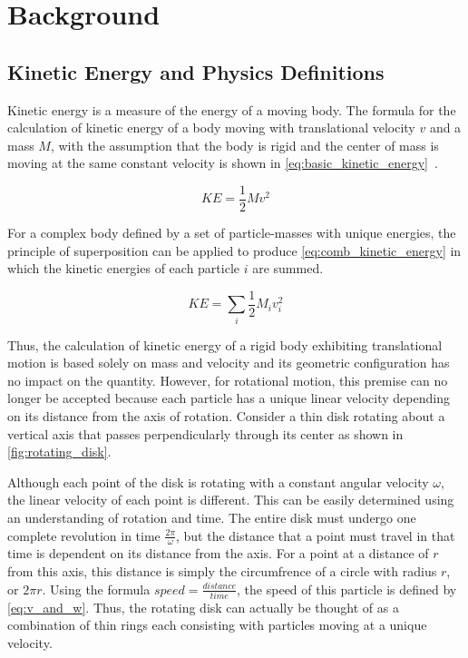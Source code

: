 \section{Background}
\label{sec:background}

\subsection{Kinetic Energy and Physics Definitions}
Kinetic energy is a measure of the energy of a moving body. The formula for the calculation of kinetic energy of a body moving with translational velocity $v$ and a mass $M$, with the assumption that the body is rigid and the center of mass is moving at the same constant velocity is shown in \cref{eq:basic_kinetic_energy}~\parencite{Young_Freedman_Young_2020}.

\begin{equation}
KE = \frac{1}{2}Mv^2
\label{eq:basic_kinetic_energy}
\end{equation}

For a complex body defined by a set of particle-masses with unique energies, the principle of superposition can be applied to produce \cref{eq:comb_kinetic_energy} in which the kinetic energies of each particle $i$ are summed.

\begin{equation}
KE = \sum_i\frac{1}{2}M_iv_i^2
\label{eq:comb_kinetic_energy}
\end{equation}

Thus, the calculation of kinetic energy of a rigid body exhibiting translational motion is based solely on mass and velocity and its geometric configuration has no impact on the quantity. However, for rotational motion, this premise can no longer be accepted because each particle has a unique linear velocity depending on its distance from the axis of rotation. Consider a thin disk rotating about a vertical axis that passes perpendicularly through its center as shown in \cref{fig:rotating_disk}.



Although each point of the disk is rotating with a constant angular velocity $\omega$, the linear velocity of each point is different. This can be easily determined using an understanding of rotation and time. The entire disk must undergo one complete revolution in time $\frac{2\pi}{\omega}$, but the distance that a point must travel in that time is dependent on its distance from the axis. For a point at a distance of $r$ from this axis, this distance is simply the circumfrence of a circle with radius $r$, or $2\pi r$. Using the formula $speed = \frac{distance}{time}$, the speed of this particle is defined by \cref{eq:v_and_w}. Thus, the rotating disk can actually be thought of as a combination of thin rings each consisting with particles moving at a unique velocity. 


